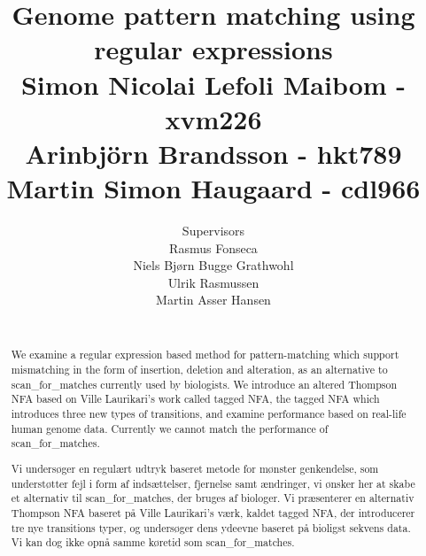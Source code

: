 \documentclass{article}
\author{
\huge{Supervisors}\\
\Large{Rasmus Fonseca}\\
\Large{Niels Bjørn Bugge Grathwohl}\\
\Large{Ulrik Rasmussen}\\
\Large{Martin Asser Hansen}\\
    \\ \texttt{}
}
\title{
  \vspace{3cm}
  \Huge{Genome pattern matching using regular expressions} \\
  \Large{Simon Nicolai Lefoli Maibom - xvm226} \\
  \Large{Arinbjörn Brandsson - hkt789}\\
  \Large{Martin Simon Haugaard - cdl966}
}
\begin{document}


\clearpage\maketitle
\thispagestyle{empty}

\newpage
\begin{abstract}
We examine a regular expression based method for pattern-matching which support mismatching in the form of insertion, deletion and alteration, as an alternative to scan\_for\_matches currently used by biologists. We introduce an altered Thompson NFA based on Ville Laurikari's work called tagged NFA, the tagged NFA which introduces three new types of transitions, and examine performance based on real-life human genome data. Currently we cannot match the performance of scan\_for\_matches.
\end{abstract}
\renewcommand*\abstractname{Resumé}
\begin{abstract}
Vi undersøger en regulært udtryk baseret metode for mønster genkendelse, som understøtter fejl i form af indsættelser, fjernelse samt ændringer, vi ønsker her at skabe et alternativ til scan\_for\_matches, der bruges af biologer. Vi præsenterer en alternativ Thompson NFA baseret på Ville Laurikari's værk, kaldet tagged NFA, der introducerer tre nye transitions typer, og undersøger dens ydeevne baseret på bioligst sekvens data. Vi kan dog ikke opnå samme køretid som scan\_for\_matches.
\end{abstract}
\newpage
\tableofcontents
 
\newpage






\newpage %







\newpage %



\end{document}
